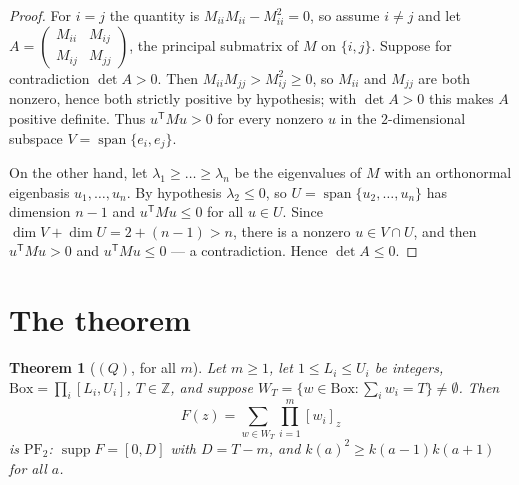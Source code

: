 \documentclass[11pt]{article}
\theoremstyle{plain}
\newtheorem{theorem}{Theorem}
\theoremstyle{definition}
\DeclareMathOperator{\supp}{supp}
\newcommand{\PFtwo}{\mathrm{PF}_2}
\newcommand{\Z}{\mathbb{Z}}
\newcommand{\Bx}{\mathrm{Box}}
\begin{document}
\begin{proof}
For $i=j$ the quantity is $M_{ii}M_{ii}-M_{ii}^2=0$, so assume $i\neq j$ and let
$A=\begin{pmatrix}M_{ii}&M_{ij}\\M_{ij}&M_{jj}\end{pmatrix}$, the principal submatrix of
$M$ on $\{i,j\}$. Suppose for contradiction $\det A>0$. Then
$M_{ii}M_{jj}>M_{ij}^2\ge0$, so $M_{ii}$ and $M_{jj}$ are both nonzero, hence both
strictly positive by hypothesis; with $\det A>0$ this makes $A$ positive definite. Thus
$u^{\mathsf T}Mu>0$ for every nonzero $u$ in the $2$-dimensional subspace
$V=\operatorname{span}\{e_i,e_j\}$.

On the other hand, let $\lambda_1\ge\dots\ge\lambda_n$ be the eigenvalues of $M$ with an
orthonormal eigenbasis $u_1,\dots,u_n$. By hypothesis $\lambda_2\le0$, so
$U=\operatorname{span}\{u_2,\dots,u_n\}$ has dimension $n-1$ and $u^{\mathsf T}Mu\le0$ for
all $u\in U$. Since $\dim V+\dim U=2+(n-1)>n$, there is a nonzero $u\in V\cap U$, and then
$u^{\mathsf T}Mu>0$ and $u^{\mathsf T}Mu\le0$ --- a contradiction. Hence $\det A\le0$.
\end{proof}

\section{The theorem}

\begin{theorem}[$(Q)$, for all $m$]\label{thm:Q}
Let $m\ge1$, let $1\le L_i\le U_i$ be integers, $\Bx=\prod_i[L_i,U_i]$, $T\in\Z$, and
suppose $W_T=\{w\in\Bx:\sum_iw_i=T\}\ne\emptyset$. Then
\[
  F(z)=\sum_{w\in W_T}\prod_{i=1}^m[w_i]_z
\]
is $\PFtwo$: $\supp F=[0,D]$ with $D=T-m$, and $k(a)^2\ge k(a-1)k(a+1)$ for all $a$.
\end{theorem}
\end{document}
